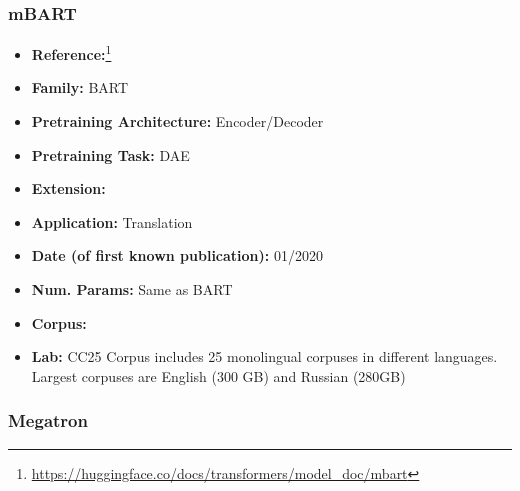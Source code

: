 \documentclass{article}
\begin{document}
\subsubsection{mBART}

            \begin{itemize}
                \item \textbf{Reference:}\footnote{\url{https://huggingface.co/docs/transformers/model_doc/mbart}}\cite{liu2020multilingual}
                \item \textbf{Family:} BART 
                \item \textbf{Pretraining Architecture:} Encoder/Decoder
                \item \textbf{Pretraining Task:} DAE
                \item \textbf{Extension:}   
                \item \textbf{Application:} Translation
                \item \textbf{Date (of first known publication):} 01/2020
                \item \textbf{Num. Params:} Same as BART
                \item \textbf{Corpus:} 
                \item \textbf{Lab:} CC25 Corpus includes 25 monolingual corpuses in different languages. Largest corpuses are English (300 GB) and Russian (280GB)
            \end{itemize}

\subsubsection{Megatron}
\end{document}
